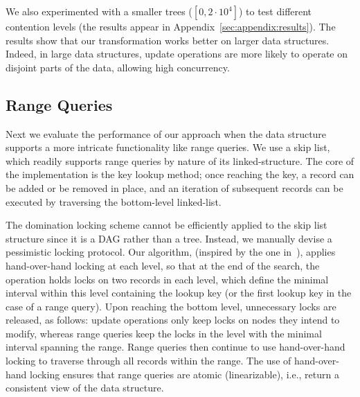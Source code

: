 We also experimented with a smaller trees ($[0,2\cdot10^4]$) to test different
contention levels (the results appear in Appendix~\ref{sec:appendix:results}).
The results show that our transformation works better on larger data structures. 
Indeed, in large data structures, update operations are more likely to operate on disjoint parts
of the data, allowing high concurrency. 

\subsection{Range Queries}
\label{sec:range}

Next we evaluate the performance of our approach when the data
structure supports a more intricate functionality like range queries.
We use a skip list, which readily supports range queries by
nature of its linked-structure. The core of the implementation is the key lookup
method; once reaching the key, a record can be added or be removed in place, and
an iteration of subsequent records can be executed by traversing
the bottom-level linked-list.

The domination locking scheme cannot be efficiently applied to the skip list
structure since it is a DAG rather than a tree. Instead, we
manually devise a pessimistic locking protocol. Our
algorithm, (inspired by the one in~\cite{HerlihyS2008}), applies
hand-over-hand locking at each level, so that at the end of the search, the
operation holds locks on two records in each level, which define the minimal interval within this level
containing the lookup key (or the first lookup key in the case of a range query). Upon
reaching the bottom level, unnecessary locks are released, as follows: update operations only keep
locks on nodes they intend to modify, whereas
range
queries keep the locks in the level with the minimal interval spanning the
range. Range queries then continue to use hand-over-hand locking to traverse through all records
within the range. The use of hand-over-hand locking ensures that range queries are atomic
(linearizable), i.e., return a consistent view of the data structure.

